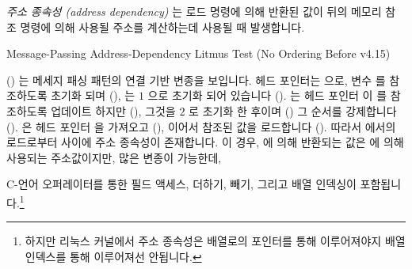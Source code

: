 \emph{주소 종속성 (address dependency)} 는 로드 명령에 의해 반환된 값이 뒤의
메모리 참조 명령에 의해 사용될 주소를 계산하는데 사용될 때 발생합니다.

\begin{listing}[tbp]

\caption{Message-Passing Address-Dependency Litmus Test (No Ordering Before v4.15)}
\label{lst:memorder:Message-Passing Address-Dependency Litmus Test (No Ordering Before v4.15)}
\end{listing}

\begin{fcvref}
()
는 메세지 패싱 패턴의 연결 기반 변종을 보입니다.
헤드 포인터는  으로,  변수  를 참조하도록 초기화 되며
(),  는 $1$ 으로 초기화 되어 있습니다 ().
 는 헤드 포인터  이  를 참조하도록 업데이트 하지만
(), 그것을 $2$ 로 초기화 한 후이며 () 그 순서를
강제합니다 ().
 은 헤드 포인터  을 가져오고 (), 이어서 참조된
값을 로드합니다 ().
따라서  에서의 로드로부터  사이에 주소 종속성이
존재합니다.
이 경우,  에 의해 반환되는 값은  에 의해 사용되는
주소값이지만, 많은 변종이 가능한데,
\end{fcvref}
C-언어 \co{->} 오퍼레이터를 통한 필드 액세스, 더하기, 빼기, 그리고 배열
인덱싱이 포함됩니다.\footnote{
	하지만 리눅스 커널에서 주소 종속성은 배열로의 포인터를 통해
	이루어져야지 배열 인덱스를 통해 이루어져선 안됩니다.}

\iffalse

